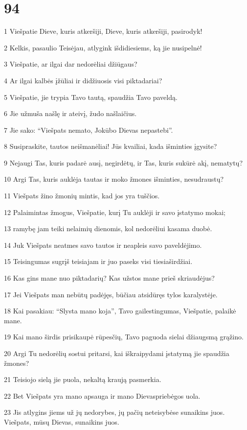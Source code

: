 \chapter{94}


\par 1 Viešpatie Dieve, kuris atkeršiji, Dieve, kuris atkeršiji, pasirodyk! 
\par 2 Kelkis, pasaulio Teisėjau, atlygink išdidiesiems, ką jie nusipelnė! 
\par 3 Viešpatie, ar ilgai dar nedorėliai džiūgaus? 
\par 4 Ar ilgai kalbės įžūliai ir didžiuosis visi piktadariai? 
\par 5 Viešpatie, jie trypia Tavo tautą, spaudžia Tavo paveldą. 
\par 6 Jie užmuša našlę ir ateivį, žudo našlaičius. 
\par 7 Jie sako: “Viešpats nemato, Jokūbo Dievas nepastebi”. 
\par 8 Susipraskite, tautos neišmanėliai! Jūs kvailiai, kada išminties įgysite? 
\par 9 Nejaugi Tas, kuris padarė ausį, negirdėtų, ir Tas, kuris sukūrė akį, nematytų? 
\par 10 Argi Tas, kuris auklėja tautas ir moko žmones išminties, nesudraustų? 
\par 11 Viešpats žino žmonių mintis, kad jos yra tuščios. 
\par 12 Palaimintas žmogus, Viešpatie, kurį Tu auklėji ir savo įstatymo mokai; 
\par 13 ramybę jam teiki nelaimių dienomis, kol nedorėliui kasama duobė. 
\par 14 Juk Viešpats neatmes savo tautos ir neapleis savo paveldėjimo. 
\par 15 Teisingumas sugrįš teisiajam ir juo paseks visi tiesiaširdžiai. 
\par 16 Kas gins mane nuo piktadarių? Kas užstos mane prieš skriaudėjus? 
\par 17 Jei Viešpats man nebūtų padėjęs, būčiau atsidūręs tylos karalystėje. 
\par 18 Kai pasakiau: “Slysta mano koja”, Tavo gailestingumas, Viešpatie, palaikė mane. 
\par 19 Kai mano širdis prisikaupė rūpesčių, Tavo paguoda sielai džiaugsmą grąžino. 
\par 20 Argi Tu nedorėlių sostui pritarsi, kai iškraipydami įstatymą jie spaudžia žmones? 
\par 21 Teisiojo sielą jie puola, nekaltą kraują pasmerkia. 
\par 22 Bet Viešpats yra mano apsauga ir mano Dievas­priebėgos uola. 
\par 23 Jis atlygins jiems už jų nedorybes, jų pačių neteisybėse sunaikins juos. Viešpats, mūsų Dievas, sunaikins juos.


